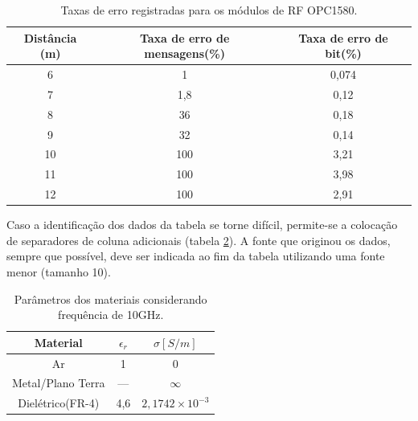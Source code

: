 \documentclass[repeatfields,xlists,xpacks,oneside,yearsonly]{ufrgscca}
\begin{document}
\begin{appendix}
        \begin{table}[htb]
            \begin{center}
                \caption{Taxas de erro registradas para os módulos de RF OPC1580.}\label{standarttable}
                \begin{tabular}{c|cc}
                    \hline
                    Distância (m) & Taxa de erro de mensagens(\%) & Taxa de erro de bit(\%)\\
                    \hline
                    6	& 1 	& 0,074\\
                    7	& 1,8	& 0,12\\
                    8 	& 36  	& 0,18\\
                    9	& 32  	& 0,14\\
                    10	& 100	& 3,21\\
                    11	& 100	& 3,98\\
                    12	& 100	& 2,91\\
                    \hline
                \end{tabular}
            \end{center}
            {}
        \end{table}

        Caso a identificação dos dados da tabela se torne difícil, permite-se a
        colocação de separadores de coluna adicionais (tabela \ref{tabvert}). A fonte que
        originou os dados, sempre que possível, deve ser indicada ao fim da tabela
        utilizando uma fonte menor (tamanho 10).

        \begin{table}[htb]
            \begin{center}
                \caption{Parâmetros dos materiais considerando frequência de 10GHz.}\label{tabvert}
                \begin{tabular}{c|c|c}
                    \hline
                    Material		& $\epsilon_r$	& $\sigma[S/m]$\\
                    \hline
                    Ar			& 1		& 0\\
                    Metal/Plano Terra 	& --- 		& $\infty$\\
                    Dielétrico(FR-4) 	& 4,6		& $2,1742\times10^{-3}$\\
                    \hline
                \end{tabular}
            \end{center}
            {}
        \end{table}


\end{appendix}
\end{document}
